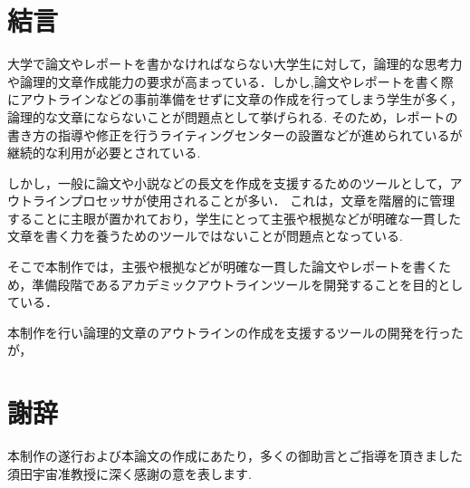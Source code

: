 \documentclass[a4j,12pt]{jarticle}
\begin{document}
\newpage
\section*{結言}
大学で論文やレポートを書かなければならない大学生に対して，論理的な思考力や論理的文章作成能力の要求が高まっている．しかし,論文やレポートを書く際にアウトラインなどの事前準備をせずに文章の作成を行ってしまう学生が多く，論理的な文章にならないことが問題点として挙げられる.
そのため，レポートの書き方の指導や修正を行うライティングセンターの設置などが進められているが継続的な利用が必要とされている.

しかし，一般に論文や小説などの長文を作成を支援するためのツールとして，アウトラインプロセッサが使用されることが多い．
これは，文章を階層的に管理することに主眼が置かれており，学生にとって主張や根拠などが明確な一貫した文章を書く力を養うためのツールではないことが問題点となっている.

そこで本制作では，主張や根拠などが明確な一貫した論文やレポートを書くため，準備段階であるアカデミックアウトラインツールを開発することを目的としている．

本制作を行い論理的文章のアウトラインの作成を支援するツールの開発を行ったが，
\section*{謝辞}
本制作の遂行および本論文の作成にあたり，多くの御助言とご指導を頂きました須田宇宙准教授に深く感謝の意を表します.

\end{document}
